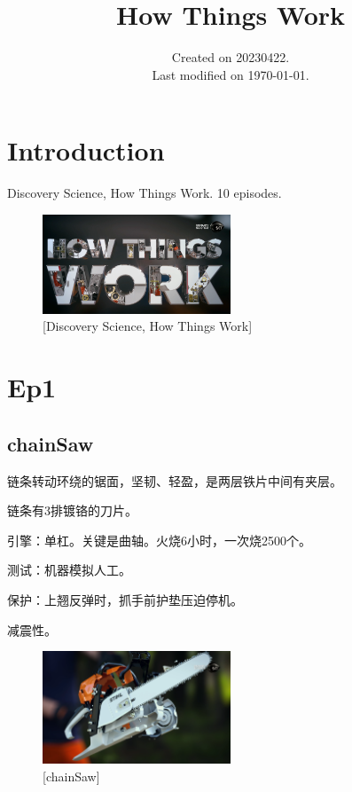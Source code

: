 \documentclass[UTF8]{../../../../RepresentationUniverse}
\begin{document}
\title{How Things Work}
\date{Created on 20230422.\\   Last modified on \today.}
\maketitle
\tableofcontents

\chapter{Introduction}

Discovery Science, How Things Work. 10 episodes.

\begin{figure}[h]
    \centering
    \includegraphics[width=0.5\textwidth]{./src/figures/Cover-Snipaste_2023-04-22_11-38-06.png}
    \caption{[Discovery Science, How Things Work]}
    \label{figure:How Things Work}
\end{figure}



\chapter{Ep1}

\section{chainSaw}

链条转动环绕的锯面，坚韧、轻盈，是两层铁片中间有夹层。

链条有3排镀铬的刀片。

引擎：单杠。关键是曲轴。火烧6小时，一次烧2500个。

测试：机器模拟人工。

保护：上翘反弹时，抓手前护垫压迫停机。

减震性。

\begin{figure}[h]
    \centering
    \includegraphics[width=0.5\textwidth]{./src/figures/chainSaw-Snipaste_2023-04-22_11-42-32.png}
    \caption{[chainSaw]}
    \label{figure:chainSaw}
\end{figure}
\end{document}
